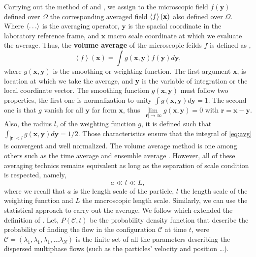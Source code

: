 
Carrying out the method of \citet{drew1983mathematical,zhang1994averaged} and \citet{jackson1997locally},  we assign to the microscopic field $f(\textbf{y})$ defined over $\Omega$ the corresponding averaged field $\left<f\right>(\textbf{x})$ also defined over $\Omega$.
Where $\left<\ldots\right>$ is the averaging operator, $\textbf{y}$ is the spacial coordinate in the laboratory reference frame,
and $\textbf{x}$ macro scale coordinate at which we evaluate the average.
Thus, the \textbf{volume average} of the microscopic feilds $f$ is defined as \citep{nott2011suspension,jackson1997locally,marle1982macroscopic},
\begin{equation}
    \left<f\right>(\textbf{x}) = \int g(\textbf{x},\textbf{y}) f(\textbf{y})d \textbf{y},
    \label{eq:avg}
\end{equation}
where $g(\textbf{x},\textbf{y})$ is the smoothing or weighting function.
The first argument $\textbf{x}$, is location at which we take the average, and \textbf{y} is the variable of integration or the local coordinate vector.
The smoothing function $g(\textbf{x},\textbf{y})$ must follow two properties, the first one is normalization to unity
$\int g(\textbf{x},\textbf{y}) d\textbf{y} = 1$.
The second one is that $g$ vanish for all $\textbf{y}$ far form $\textbf{x}$, thus $\lim\limits_{|\textbf{r}| \to \infty} g(\textbf{x},\textbf{y}) = 0$ with $\textbf{r} = \textbf{x} - \textbf{y}$.
Also, the radius $l$, of the weighting function $g$, it is defined such that $\int_{|\textbf{r}|<l} g(\textbf{x},\textbf{y})d\textbf{y} = 1/2$.
Those characteristics ensure that the integral of \ref{eq:avg} is convergent and well normalized.
The volume average method is one among others such as the time average \citep{ishii2010thermo} and ensemble average \citep{zhang1994averaged}. 
However, all of these averaging technics remains equivalent \citep{jackson1997locally} as long as the separation of scale condition is respected, namely,
\begin{equation*}
    a \ll l \ll L,
\end{equation*}
where we recall that $a$ is the length scale of the particle, $l$ the length scale of the weighting function and $L$ the macroscopic length scale.
Similarly, we can use the statistical approach to carry out the average. 
We follow \citet{zhang2021ensemble} which extended the definition of \citet{batchelor1972sedimentation}. 
Let, $P(\mathscr{C},t)$ be the probability density function that describe the probability of finding the flow in the configuration $\mathscr{C}$ at time $t$, were $\mathscr{C} = (\lambda_1,\lambda_1,\lambda_1,\ldots\lambda_N )$ is the finite set of all the parameters describing the dispersed multiphase flows (such as the particles' velocity and position \ldots).  
